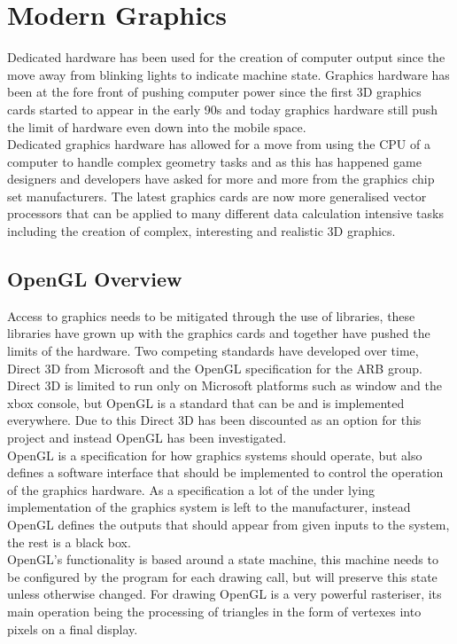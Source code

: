\section{Modern Graphics}
Dedicated hardware has been used for the creation of computer output since the
move away from blinking lights to indicate machine state. Graphics hardware has
been at the fore front of pushing computer power since the first 3D graphics 
cards started to appear in the early 90s and today graphics hardware still push
the limit of hardware even down into the mobile space.\\

Dedicated graphics hardware has allowed for a move from using the CPU of a 
computer to handle complex geometry tasks and as this has happened game designers
and developers have asked for more and more from the graphics chip set
manufacturers. The latest graphics cards are now more generalised vector 
processors that can be applied to many different data calculation intensive tasks
including the creation of complex, interesting and realistic 3D graphics.\\

\subsection{OpenGL Overview} 
Access to graphics needs to be mitigated through the use of libraries, these 
libraries have grown up with the graphics cards and together have pushed the 
limits of the hardware. Two competing standards have developed over time, Direct
3D from Microsoft and the OpenGL specification for the ARB group. Direct 3D is 
limited to run only on Microsoft platforms such as window and the xbox console,
but OpenGL is a standard that can be and is implemented everywhere. Due to this
Direct 3D has been discounted as an option for this project and instead OpenGL
has been investigated.\\

OpenGL is a specification for how graphics systems should operate, but also 
defines a software interface that should be implemented to control the operation
of the graphics hardware. As a specification a lot of the under lying 
implementation of the graphics system is left to the manufacturer, instead 
OpenGL defines the outputs that should appear from given inputs to the system,
the rest is a black box.\\

OpenGL's functionality is based around a state machine, this machine needs to be
configured by the program for each drawing call, but will preserve this state 
unless otherwise changed. For drawing OpenGL is a very powerful rasteriser, its
main operation being the processing of triangles in the form of vertexes into
pixels on a final display. \\

